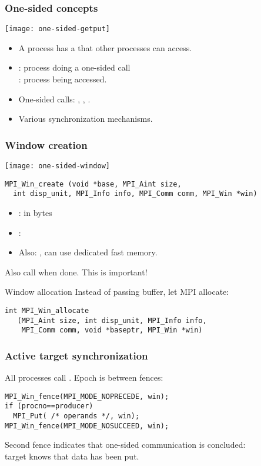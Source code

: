\begin{frame}[containsverbatim]\frametitle{One-sided concepts}
  \texttt{[image: one-sided-getput]}
  \begin{itemize}
  \item A process has a  that other processes can access.
  \item {}: process doing a one-sided call\\
    : process being accessed.
  \item One-sided calls: , , .
  \item Various synchronization mechanisms.
  \end{itemize}
\end{frame}

\begin{frame}[containsverbatim]\frametitle{Window creation}
  \texttt{[image: one-sided-window]}
\lstset{language=C}
\begin{lstlisting}
MPI_Win_create (void *base, MPI_Aint size, 
  int disp_unit, MPI_Info info, MPI_Comm comm, MPI_Win *win)
\end{lstlisting}
\begin{itemize}
\item {}: in bytes
\item {}: 
\item Also: , can use dedicated fast memory.
\end{itemize}
Also call  when done. This is important!
\end{frame}

\begin{frame}[containsverbatim]{Window allocation}
  Instead of passing buffer, let MPI allocate:
\lstset{language=C}
\begin{lstlisting}
int MPI_Win_allocate
   (MPI_Aint size, int disp_unit, MPI_Info info,
    MPI_Comm comm, void *baseptr, MPI_Win *win)
\end{lstlisting}
\end{frame}

\begin{frame}[containsverbatim]\frametitle{Active target synchronization}
  All processes call . Epoch is between fences:
\lstset{language=C}
\begin{lstlisting}
MPI_Win_fence(MPI_MODE_NOPRECEDE, win);
if (procno==producer)
  MPI_Put( /* operands */, win);
MPI_Win_fence(MPI_MODE_NOSUCCEED, win);
\end{lstlisting}
Second fence indicates that one-sided communication is concluded:\\
target knows that data has been put.
\end{frame}

